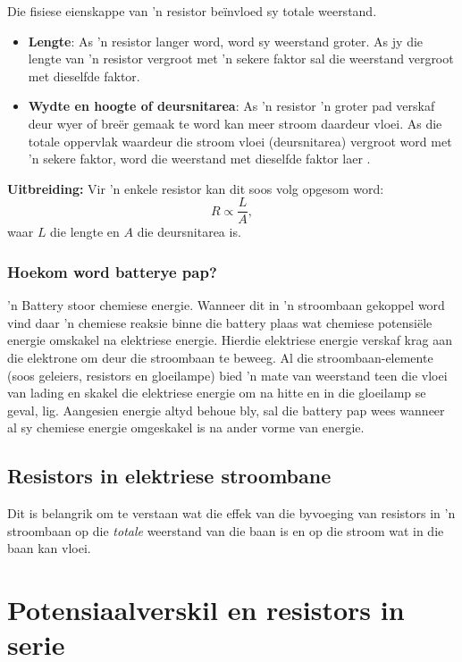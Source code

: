 Die fisiese eienskappe van 'n resistor be\"invloed sy totale weerstand.
\begin{itemize}
 \item \textbf{Lengte}: As 'n resistor langer word, word sy weerstand groter.
As jy die lengte van 'n resistor vergroot met 'n sekere faktor sal die
weerstand vergroot met dieselfde faktor.
\item \textbf{Wydte en hoogte of deursnitarea}: As 'n resistor 'n groter pad
verskaf deur wyer of bre\"er gemaak te word kan meer stroom daardeur vloei. As
die totale oppervlak waardeur die stroom vloei (deursnitarea) vergroot word
met 'n sekere faktor, word die weerstand met dieselfde faktor laer .
\end{itemize}
\textbf{Uitbreiding:} Vir 'n enkele resistor kan dit soos volg opgesom word:
\begin{equation*}
 R\propto\frac{L}{A},
\end{equation*} waar $L$ die lengte en $A$ die deursnitarea is.

\subsubsection*{Hoekom word batterye pap?}
 'n Battery stoor chemiese energie. Wanneer dit in 'n stroombaan gekoppel word
vind daar 'n chemiese reaksie binne die battery plaas wat chemiese
potensi\"ele energie omskakel na elektriese energie. Hierdie elektriese energie
verskaf krag aan die elektrone om deur die stroombaan te beweeg. Al die
stroombaan-elemente (soos geleiers, resistors en gloeilampe) bied 'n mate van
weerstand teen die vloei van lading en skakel die elektriese energie om na
hitte en in die gloeilamp se geval, lig.
Aangesien energie altyd behoue bly, sal die battery pap wees wanneer al sy
chemiese energie omgeskakel is na ander vorme van energie.

\subsection*{Resistors in elektriese stroombane}
Dit is belangrik om te verstaan wat die effek van die byvoeging van
resistors in 'n stroombaan op die \textit{totale} weerstand van die baan is en
op die stroom wat in die baan kan vloei.


\section{Potensiaalverskil en resistors in serie}


